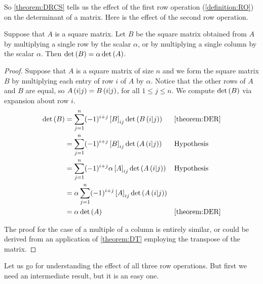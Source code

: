 \documentclass{ximera}
\begin{document}
So \ref{theorem:DRCS} tells us the effect of the first row operation
(\ref{definition:RO}) on the determinant of a matrix.  Here is the
effect of the second row operation.



\begin{theorem}
  \label{theorem:DRCM}

  Suppose that $A$ is a square matrix.  Let $B$ be the square matrix
  obtained from $A$ by multiplying a single row by the scalar
  $\alpha$, or by multiplying a single column by the scalar $\alpha$.
  Then $\det\left(B\right)=\alpha\det\left(A\right)$.

  \begin{proof}
    Suppose that $A$ is a square matrix of size $n$ and we form the
    square matrix $B$ by multiplying each entry of row $i$ of $A$ by
    $\alpha$.  Notice that the other rows of $A$ and $B$ are equal, so
    $A\left(i|j\right)=B\left(i|j\right)$, for all
    $1\leq j\leq n$.  We compute $\det\left(B\right)$ via expansion about row
    $i$.
    \begin{align*}
      \det\left(B\right)
      &=
        \sum_{j=1}^{n}(-1)^{i+j}\left\lbrack B\right\rbrack_{ij}\det\left(B\left(i|j\right)\right)
      &&\ref{theorem:DER}\\
      &=
        \sum_{j=1}^{n}(-1)^{i+j}\left\lbrack B\right\rbrack_{ij}\det\left(A\left(i|j\right)\right)
      &&\text{Hypothesis}\\
      &=
        \sum_{j=1}^{n}(-1)^{i+j}\alpha\left\lbrack A\right\rbrack_{ij}\det\left(A\left(i|j\right)\right)
      &&\text{Hypothesis}\\
      &=
        \alpha\sum_{j=1}^{n}(-1)^{i+j}\left\lbrack A\right\rbrack_{ij}\det\left(A\left(i|j\right)\right)\\
      &=
        \alpha\det\left(A\right)&&\ref{theorem:DER}\\
    \end{align*}

    The proof for the case of a multiple of a column is entirely
    similar, or could be derived from an application of
    \ref{theorem:DT} employing the transpose of the matrix.
  \end{proof}
\end{theorem}

Let us go for understanding the effect of all three row operations.
But first we need an intermediate result, but it is an easy one.
\end{document}
